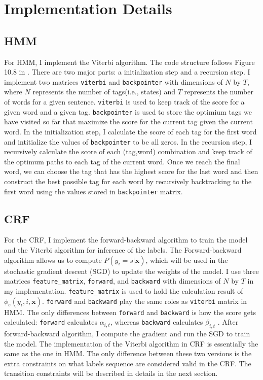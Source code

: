 \documentclass[11pt,a4paper]{article}
\begin{document}
\section{Implementation Details}

\subsection{HMM}

For HMM, I implement the Viterbi algorithm. 
The code structure follows Figure 10.8 in \citet{Jurafsky:2017}. There
are two major parts: a initialization step and a recursion step. I implement two matrices
\verb|viterbi| and \verb|backpointer| with dimensions of $N$ by $T$, where
$N$ represents the number of tags(i.e., states) and $T$ represents the number of
words for a given sentence. \verb|viterbi| is used to keep track of the score for 
a given word and a given tag. \verb|backpointer| is used to store the optimium 
tags we have visited so far that maximize the score for the current tag given
the current word. In the initialization step, I calculate the score of each tag
for the first word and intitialize the values of \verb|backpointer| to be all zeros. In the recursion
step, I recursively calculate the score of each (tag,word) combination and keep track
of the optimum paths to each tag of the current word. Once we reach the final word, we can choose the tag that has the
highest score for the last word and then construct the best possible tag for each
word by recursively backtracking to the first word using the values stored 
in \verb|backpointer| matrix.

\subsection{CRF}

For the CRF, I implement the forward-backward
algorithm to train the model and the Viterbi algorithm for inference of the labels.
The Forward-backward algorithm allows us to compute $P(y_i = s|\boldsymbol{x})$,
which will be used in the stochastic gradient descent (SGD) to update the weights of the model.
I use three matrices \verb|feature_matrix|, \verb|forward|, and \verb|backward| with dimensions
of $N$ by $T$ in my implementation. \verb|feature_matrix| is used to hold the calculation result
of $\phi_e(y_i,i,\boldsymbol{x})$. \verb|forward| and \verb|backward|
play the same roles as \verb|viterbi| matrix in HMM. The only differences between \verb|forward| and
\verb|backward| is how the score gets calculated: \verb|forward| calculates $\alpha_{i,t}$, whereas \verb|backward|
calculates $\beta_{i,t}$ \cite{Marsland:2014}. After forward-backward algorithm, I compute the gradient and
run the SGD to train the model. The implementation of the Viterbi algorithm in CRF is essentially
the same as the one in HMM. The only difference between these two versions is the extra constraints
on what labels sequence are considered valid in the CRF. The transition constraints
will be described in details in the next section.
\end{document}
